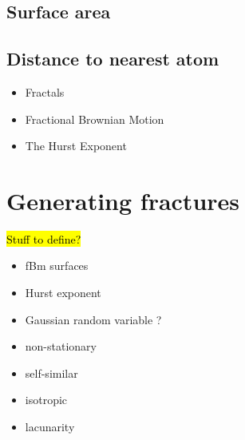% 
% 
% 
% 
% 




\subsection{Surface area}
\subsection{Distance to nearest atom}
\begin{itemize}
    \item Fractals
    \item Fractional Brownian Motion
    \item The Hurst Exponent
\end{itemize}

\section{Generating fractures}
\hl{Stuff to define?}
\begin{itemize}
    \item fBm surfaces
    \item Hurst exponent
    \item Gaussian random variable ?
    \item non-stationary
    \item self-similar
    \item isotropic
    \item lacunarity
\end{itemize}

